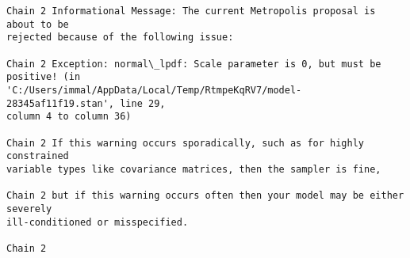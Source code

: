 \documentclass[11pt]{article}
\begin{document}
    \begin{Verbatim}[commandchars=\\\{\}]
Chain 2 Informational Message: The current Metropolis proposal is about to be
rejected because of the following issue:

Chain 2 Exception: normal\_lpdf: Scale parameter is 0, but must be positive! (in
'C:/Users/immal/AppData/Local/Temp/RtmpeKqRV7/model-28345af11f19.stan', line 29,
column 4 to column 36)

Chain 2 If this warning occurs sporadically, such as for highly constrained
variable types like covariance matrices, then the sampler is fine,

Chain 2 but if this warning occurs often then your model may be either severely
ill-conditioned or misspecified.

Chain 2

    \end{Verbatim}
\end{document}

